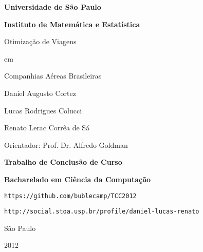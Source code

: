 \thispagestyle{empty}

\begin{center}

{\Large \bf Universidade de São Paulo}

\vspace{0.2cm}

{\Large \bf Instituto de Matemática e Estatística}

\vspace{3.0cm}

{\Large \sc Otimização de Viagens}

\vspace{0.2cm}

{\Large \sc em}

\vspace{0.2cm}

{\Large \sc Companhias Aéreas Brasileiras}

\vspace{2.0cm}

{\large Daniel Augusto Cortez}

{\large Lucas Rodrigues Colucci}

{\large Renato Lerac Corrêa de Sá}

\end{center}

\vspace{1.0cm}

\begin{flushright}
{\large Orientador: Prof. Dr. Alfredo Goldman}
\end{flushright}

\begin{center}
	
\vspace{2.0cm}

{\large \bf Trabalho de Conclusão de Curso}

{\large \bf Bacharelado em Ciência da Computação}

\vspace{1.0cm}

{\large \verb|https://github.com/bublecamp/TCC2012|}

{\large \verb|http://social.stoa.usp.br/profile/daniel-lucas-renato|}

\vfill
	
{\large São Paulo}

{\large 2012}

\end{center}

